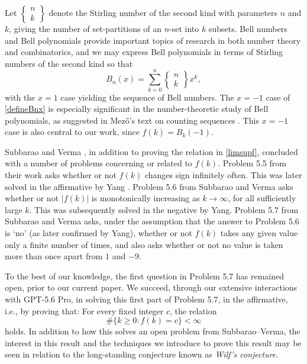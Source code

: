 \documentclass[11pt,letterpaper]{amsart}
\begin{document}
 Let $\left\{ \begin{smallmatrix} n \\ k \end{smallmatrix} \right\} $ denote the Stirling number of the second kind
 with parameters $n$ and $k$, giving the number of set-partitions of an $n$-set into $k$ subsets. 
 Bell numbers and Bell polynomials 
 provide important topics of research in both number theory and combinatorics, 
 and we may express Bell polynomials in terms of Stirling numbers of the second kind so that 
\begin{equation}\label{defineBnx}
 B_{n}(x) = \sum_{k=0}^{n} \left\{ \begin{matrix} n \\ k \end{matrix} \right\} x^k, 
\end{equation}
 with the $x = 1$ case yielding the sequence of Bell numbers. 
 The $x = -1$ case of \eqref{defineBnx} is especially significant in the number-theoretic study of Bell polynomials, 
 as suggested in Mez\H o's text on 
 counting sequences \cite[\S3.2.3]{Mezo2020}. 
 This $x = -1$ case is also central to our work, since 
 $ f(k) = B_k(-1)$. 

 Subbarao and Verma \cite{SubbaraoVerma2001}, in addition to proving the relation in \eqref{limsupf}, concluded with a number of 
 problems concerning or related to $f(k)$. Problem 5.5 from their work
 asks whether or not $f(k)$ changes sign infinitely often. 
 This was later solved in the affirmative by Yang \cite{Yang2001}. 
 Problem 5.6 from Subbarao and Verma 
 asks whether or not $|f(k)|$ is monotonically increasing as $k \to \infty$, for all sufficiently large $k$.
 This was subsequently 
 solved in the negative by Yang. 
 Problem 5.7 from Subbarao and Verma 
 asks, under the assumption that the answer to Problem 5.6 is `no' (as later confirmed by Yang), 
 whether or not $f(k)$ takes any given value only a finite number of times, 
 and also asks whether or not no value is taken more than once apart from $1$ and $-9$. 

 To the best of our knowledge, the first question in Problem 5.7 \cite{SubbaraoVerma2001} has remained open, prior to our current paper. 
 We succeed, 
 through our extensive interactions with GPT-5.6 
 Pro, in solving this first part of Problem 5.7, in the affirmative, i.e., by proving that: For every fixed integer $c$, the relation
\begin{equation}\label{displaymain}
 \#\{ k \geq 0 : f(k) = c \} < \infty 
\end{equation}
 holds. 
 In addition to how this solves an open problem from Subbarao--Verma, 
 the interest in this result 
 and the techniques we introduce to prove this result 
 may be seen in relation to the long-standing conjecture 
 known as \emph{Wilf's conjecture}. 
\end{document}
